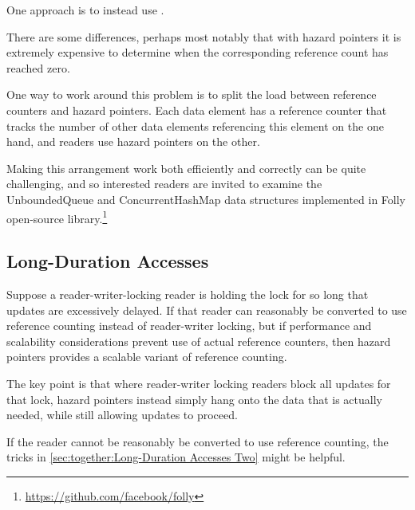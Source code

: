 One approach is to instead use .

There are some differences, perhaps most notably that with
hazard pointers it is extremely expensive to determine when
the corresponding reference count has reached zero.

One way to work around this problem is to split the load between
reference counters and hazard pointers.
Each data element has a reference counter that tracks the number
of other data elements referencing this element on the one hand,
and readers use hazard pointers on the other.

Making this arrangement work both efficiently and correctly can be
quite challenging, and so interested readers are invited to examine
the UnboundedQueue and ConcurrentHashMap data structures implemented in
Folly open-source library.\footnote{
	\url{https://github.com/facebook/folly}}

\subsection{Long-Duration Accesses}
\label{sec:together:Long-Duration Accesses}

Suppose a reader-writer-locking reader is holding the lock for so
long that updates are excessively delayed.
If that reader can reasonably be converted to use reference counting
instead of reader-writer locking, but if performance and scalability
considerations prevent use of actual reference counters, then hazard
pointers provides a scalable variant of reference counting.

The key point is that where reader-writer locking readers block all
updates for that lock, hazard pointers instead simply hang onto the
data that is actually needed, while still allowing updates to proceed.

If the reader cannot be reasonably be converted to use reference
counting, the tricks in \cref{sec:together:Long-Duration Accesses Two}
might be helpful.



